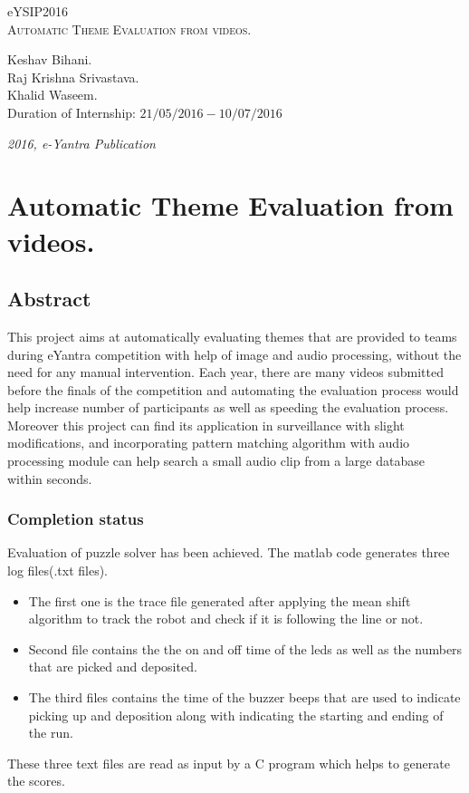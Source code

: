 \documentclass[a4paper,12pt,oneside]{book}
\begin{document}
\begin{titlepage}
\raggedright
{\Large eYSIP2016\\[1cm]}
{\Huge\scshape Automatic Theme Evaluation from videos. \\[.1in]}
\vfill
\begin{flushright}
{\large Keshav Bihani. \\}
{\large Raj Krishna Srivastava. \\}
{\large Khalid Waseem. \\}
{\large Duration of Internship: $ 21/05/2016-10/07/2016 $ \\}
\end{flushright}

{\itshape 2016, e-Yantra Publication}
\end{titlepage}

\chapter[Project Tag]{Automatic Theme Evaluation from videos.}
\section*{Abstract}
This project aims at automatically evaluating themes that are provided to teams during eYantra competition with help of image and audio processing, without the need for any manual intervention.
Each year, there are many videos submitted before the finals of the competition and automating the evaluation process would help increase number of participants as well as speeding the evaluation process. Moreover this project can find its application in surveillance with slight modifications, and incorporating pattern matching algorithm with audio processing module can help search a small audio clip from a large database within seconds.  

\subsection*{Completion status}
Evaluation of puzzle solver has been achieved. The matlab code generates three log files(.txt files).
\begin{itemize}
  \item The first one is the trace file generated after applying the mean shift algorithm to track the robot and check if it is following the line or not.
  \item Second file contains the the on and off time of the leds as well as the numbers that are picked and deposited.
  \item The third files contains the time of the buzzer beeps that are used to indicate picking up and deposition along with indicating the starting and ending of the run.
\end{itemize} 
These three text files are read as input by a C program which helps to generate the scores.
\end{document}
